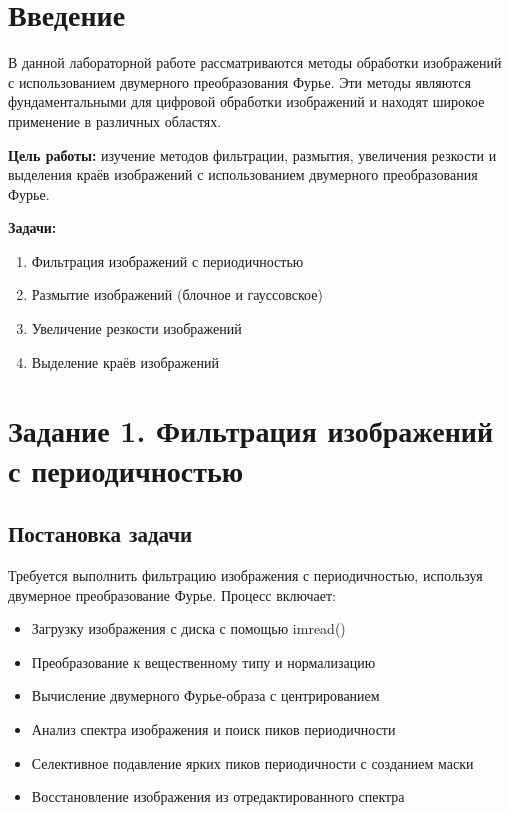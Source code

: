 \section*{Введение}

В данной лабораторной работе рассматриваются методы обработки изображений с использованием двумерного преобразования Фурье. Эти методы являются фундаментальными для цифровой обработки изображений и находят широкое применение в различных областях.

\textbf{Цель работы:} изучение методов фильтрации, размытия, увеличения резкости и выделения краёв изображений с использованием двумерного преобразования Фурье.

\textbf{Задачи:}
\begin{enumerate}
    \item Фильтрация изображений с периодичностью
    \item Размытие изображений (блочное и гауссовское)
    \item Увеличение резкости изображений
    \item Выделение краёв изображений
\end{enumerate}

\section*{Задание 1. Фильтрация изображений с периодичностью}

\subsection*{Постановка задачи}

Требуется выполнить фильтрацию изображения с периодичностью, используя двумерное преобразование Фурье. Процесс включает:
\begin{itemize}
    \item Загрузку изображения с диска с помощью imread()
    \item Преобразование к вещественному типу и нормализацию
    \item Вычисление двумерного Фурье-образа с центрированием
    \item Анализ спектра изображения и поиск пиков периодичности
    \item Селективное подавление ярких пиков периодичности с созданием маски
    \item Восстановление изображения из отредактированного спектра
\end{itemize}

